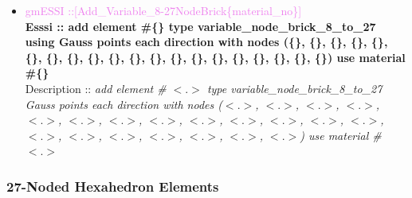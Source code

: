 \documentclass[11pt]{article}
\begin{document}
\begin{itemize}
    \item \textcolor{violet}{gmESSI ::[Add\_Variable\_8-27NodeBrick\{material\_no\}]} \\             
    \textbf{Esssi :: add element \#\{\} type variable\_node\_brick\_8\_to\_27 using  Gauss points each direction with nodes (\{\}, \{\}, \{\}, \{\}, \{\}, \{\}, \{\}, \{\}, \{\}, \{\}, \{\}, \{\}, \{\}, \{\}, \{\}, \{\}, \{\}, \{\}, \{\}, \{\}) use material \#\{\}}\\
    Description :: \textit{ add element \# $<.>$ type variable\_node\_brick\_8\_to\_27 Gauss points each direction with nodes ($<.>$, $<.>$, $<.>$, $<.>$, $<.>$, $<.>$, $<.>$, $<.>$, $<.>$, $<.>$, $<.>$, $<.>$, $<.>$, $<.>$, $<.>$, $<.>$, $<.>$, $<.>$, $<.>$, $<.>$) use material \# $<.>$}

  \end{itemize}

\subsubsection{27-Noded Hexahedron Elements}
\end{document}

